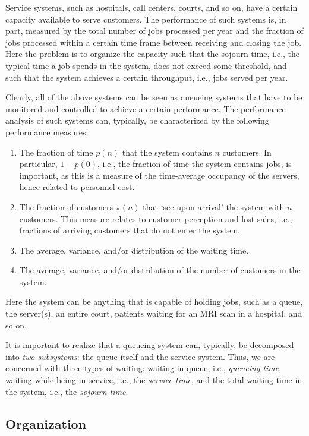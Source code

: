 Service systems, such as hospitals, call centers, courts, and so on, have a certain capacity available to serve customers.
The performance of such systems is, in part, measured by the total number of jobs processed per year and the fraction of jobs processed within a certain time frame between receiving and closing the job.
Here the problem is to organize the capacity such that the sojourn time, i.e., the typical time a job spends in the system, does not exceed some threshold, and such that the system achieves a certain throughput, i.e., jobs served per year.

Clearly, all of the above systems can be seen as queueing systems that have to be monitored and controlled to achieve a certain performance.
The performance analysis of such systems can, typically, be characterized by the following performance measures:
\begin{enumerate}
\item The fraction of time $p(n)$ that the system contains $n$ customers.
 In particular, $1-p(0)$, i.e., the fraction of time the system contains jobs, is important, as this is a measure of the time-average occupancy of the servers, hence related to personnel cost.
\item The fraction of customers $\pi(n)$ that `see upon arrival' the system with $n$ customers.
  This measure relates to customer perception and lost sales, i.e., fractions of arriving customers that do not enter the system.
\item The average, variance, and/or distribution of the waiting time.
\item The average, variance, and/or distribution of the number of customers in the system.\
\end{enumerate}
Here the system can be anything that is capable of holding jobs, such as a queue, the server(s), an entire court, patients waiting for an MRI scan in a hospital, and so on.

It is important to realize that a queueing system can, typically, be decomposed into \emph{two subsystems}: the queue itself and the service system.
Thus, we are concerned with three types of waiting: waiting in queue, i.e., \emph{queueing time}, waiting while being in service, i.e., the \emph{service time}, and the total waiting time in the system, i.e., the \emph{sojourn time}.

\subsection*{Organization}


